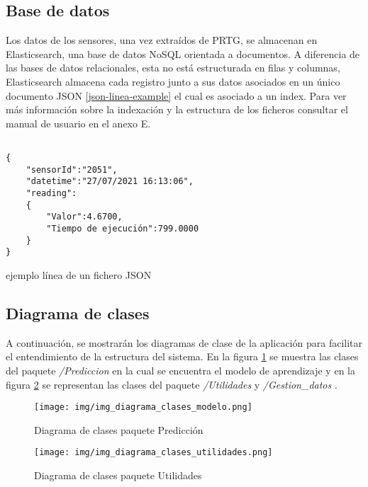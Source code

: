 \clearpage

\subsection{Base de datos}

Los datos de los sensores, una vez extraídos de PRTG, se almacenan en Elasticsearch, una base de datos NoSQL orientada a documentos. A diferencia de las bases de datos relacionales, esta no está estructurada en filas y columnas, Elasticsearch almacena cada registro junto a sus datos asociados en un único documento JSON \ref{json-linea-example} el cual es asociado a un index. Para ver más información sobre la indexación y la estructura de los ficheros consultar el manual de usuario en el anexo E.

\begin{listing}
\begin{verbatim}

{
    "sensorId":"2051",
    "datetime":"27/07/2021 16:13:06",
    "reading": 
    {
        "Valor":4.6700,
        "Tiempo de ejecución":799.0000
    }
}
\end{verbatim}
\caption{ejemplo línea de un fichero JSON} 
\label{json-linea-example}
\end{listing}

\clearpage

\subsection{Diagrama de clases}
 A continuación, se mostrarán los diagramas de clase de la aplicación para facilitar el entendimiento de la estructura del sistema. En la figura \ref{img_diagrama_clases_modelo} se muestra las clases del paquete \textit{/Prediccion} en la cual se encuentra el modelo de aprendizaje y en la figura \ref{img_diagrama_clases_Utilidades} se representan las clases del paquete \textit{/Utilidades} y \textit{/Gestion\_datos} .
 
\begin{figure}[!h]
	\centering
	\texttt{[image: img/img\_diagrama\_clases\_modelo.png]}
	\caption{Diagrama de clases paquete Predicción}
	\label{img_diagrama_clases_modelo}
\end{figure}

\begin{figure}[!h]
	\centering
	\texttt{[image: img/img\_diagrama\_clases\_utilidades.png]}
	\caption{Diagrama de clases paquete Utilidades}
	\label{img_diagrama_clases_Utilidades}
\end{figure}

